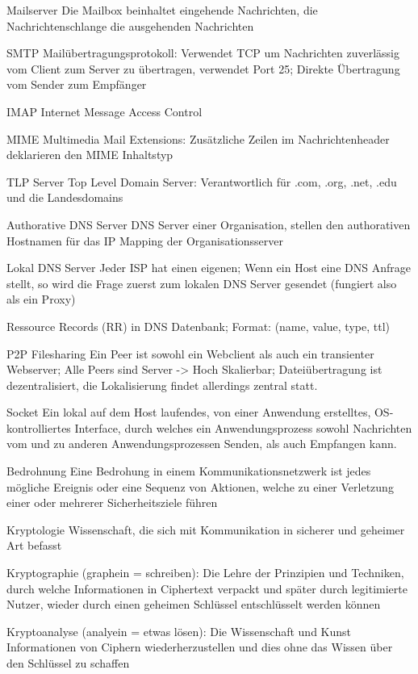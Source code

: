 \documentclass[10pt,landscape]{article}
\begin{document}
\begin{multicols}{3}
\begin{description*}
        \item[Mailserver] Die Mailbox beinhaltet eingehende Nachrichten, die Nachrichtenschlange die ausgehenden Nachrichten
        \item[SMTP] Mailübertragungsprotokoll: Verwendet TCP um Nachrichten zuverlässig vom Client zum Server zu übertragen, verwendet Port 25; Direkte Übertragung vom Sender zum Empfänger
        \item[IMAP] Internet Message Access Control
        \item[MIME] Multimedia Mail Extensions: Zusätzliche Zeilen im Nachrichtenheader deklarieren den MIME Inhaltstyp
        \item[TLP Server] Top Level Domain Server: Verantwortlich für .com, .org, .net, .edu und die Landesdomains
        \item[Authorative DNS Server] DNS Server einer Organisation, stellen den authorativen Hostnamen für das IP Mapping der Organisationsserver
        \item[Lokal DNS Server] Jeder ISP hat einen eigenen; Wenn ein Host eine DNS Anfrage stellt, so wird die Frage zuerst zum lokalen DNS Server gesendet (fungiert also als ein Proxy)
        \item[Ressource Records (RR)] in DNS Datenbank; Format: (name, value, type, ttl)
        \item[P2P Filesharing] Ein Peer ist sowohl ein Webclient als auch ein transienter Webserver; Alle Peers sind Server -> Hoch Skalierbar; Dateiübertragung ist dezentralisiert, die Lokalisierung findet allerdings zentral statt.
        \item[Socket] Ein lokal auf dem Host laufendes, von einer Anwendung erstelltes, OS-kontrolliertes Interface, durch welches ein Anwendungsprozess sowohl Nachrichten vom und zu anderen Anwendungsprozessen Senden, als auch Empfangen kann.
        \item[Bedrohnung] Eine Bedrohung in einem Kommunikationsnetzwerk ist jedes mögliche Ereignis oder eine Sequenz von Aktionen, welche zu einer Verletzung einer oder mehrerer Sicherheitsziele führen
        \item[Kryptologie] Wissenschaft, die sich mit Kommunikation in sicherer und geheimer Art befasst
        \item[Kryptographie] (graphein = schreiben): Die Lehre der Prinzipien und Techniken, durch welche Informationen in Ciphertext verpackt und später durch legitimierte Nutzer, wieder durch einen geheimen Schlüssel entschlüsselt werden können
        \item[Kryptoanalyse] (analyein = etwas lösen): Die Wissenschaft und Kunst Informationen von Ciphern wiederherzustellen und dies ohne das Wissen über den Schlüssel zu schaffen

\end{description*}
\end{multicols}
\end{document}
